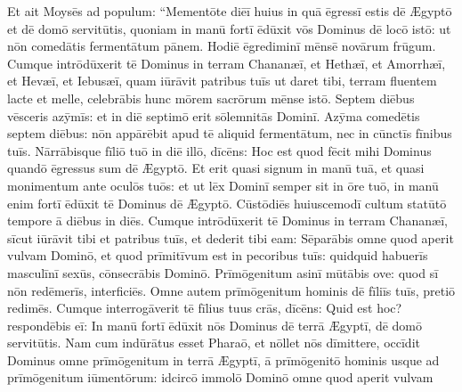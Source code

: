 Et ait
Moysēs ad populum: ``Mementōte diēī huius in
quā ēgressī estis dē Ægyptō et dē domō servitūtis, quoniam in manū fortī
ēdūxit vōs Dominus dē locō istō: ut nōn comedātis fermentātum pānem. Hodiē ēgrediminī mēnsē
novārum frūgum. Cumque intrōdūxerit tē Dominus in terram
Chananæī, et Hethæī, et Amorrhæī, et Hevæī, et Iebusæī,
quam iūrāvit patribus tuīs ut daret tibi, terram fluentem
lacte et melle, celebrābis hunc mōrem sacrōrum mēnse istō.
Septem diēbus vēsceris azȳmīs: et in diē septimō erit
sōlemnitās Dominī. Azȳma comedētis septem diēbus: nōn appārēbit
apud tē aliquid fermentātum, nec in cūnctīs fīnibus tuīs. Nārrābisque
fīliō tuō in diē illō, dīcēns: Hoc est quod fēcit mihi Dominus quandō
ēgressus sum dē Ægyptō. Et erit quasi signum in manū tuā, et quasi
monimentum ante oculōs tuōs: et ut lēx Dominī semper sit
in ōre tuō, in manū enim fortī ēdūxit tē Dominus dē Ægyptō. Cūstōdiēs
huiuscemodī cultum statūtō tempore ā diēbus in diēs. Cumque intrōdūxerit
tē Dominus in terram Chananæī, sīcut iūrāvit tibi et patribus tuīs, et
dederit tibi eam: Sēparābis omne quod aperit vulvam
Dominō, et quod prīmitīvum est in pecoribus tuīs: quidquid
habuerīs masculīnī sexūs, 
cōnsecrābis Dominō. Prīmōgenitum asinī mūtābis ove: quod sī nōn redēmerīs,
interficiēs. Omne autem prīmōgenitum hominis dē fīliīs tuīs, pretiō
redimēs. Cumque interrogāverit tē fīlius tuus crās, dīcēns: Quid est
hoc? respondēbis eī: In manū fortī ēdūxit nōs Dominus dē terrā Ægyptī, dē
domō servitūtis. Nam cum indūrātus esset
Pharaō, et nōllet nōs dīmittere, occīdit Dominus omne
prīmōgenitum in terrā Ægyptī, ā prīmōgenitō hominis usque
ad prīmōgenitum iūmentōrum: idcircō
immolō Dominō omne quod aperit vulvam
